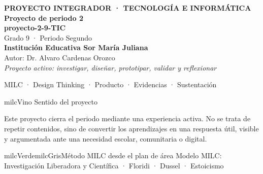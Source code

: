 \documentclass[11pt,letterpaper]{article}
\begin{document}
\thispagestyle{empty}

\vspace*{.85cm}
\begin{tcolorbox}[
  enhanced,colback=milcVino,colframe=milcVino,arc=12mm,width=.86\textwidth,
  boxrule=0pt,left=12mm,right=12mm,top=11mm,bottom=11mm,center,
  overlay={\draw[milcMagenta,line width=2pt,dash pattern=on 9pt off 8pt,rounded corners=10mm]
  ([xshift=7mm,yshift=-7mm]frame.north west) rectangle ([xshift=-7mm,yshift=7mm]frame.south east);}]
  \centering
  {\sffamily\bfseries\color{white}\fontsize{15}{17}\selectfont PROYECTO INTEGRADOR · TECNOLOGÍA E INFORMÁTICA}\\[1.0cm]
  {\sffamily\bfseries\color{white}\fontsize{30}{33}\selectfont Proyecto de periodo 2}\\[3mm]
  {\sffamily\bfseries\color{milcMostaza}\fontsize{25}{28}\selectfont proyecto-2-9-TIC}\\[8mm]
  {\sffamily\color{white}\Large Grado 9 · Periodo Segundo}\\[1.0cm]
  {\sffamily\bfseries\color{white}\large Institución Educativa Sor María Juliana}\\[2mm]
  {\sffamily\color{white}Autor: Dr. Alvaro Cardenas Orozco}\\[4mm]
  {\sffamily\itshape\color{white}Proyecto activo: investigar, diseñar, prototipar, validar y reflexionar}
\end{tcolorbox}
\vfill
\begin{tcolorbox}[enhanced,colback=milcVino!72!black,colframe=milcVino!72!black,arc=5mm,boxrule=0pt,width=.86\textwidth,left=6mm,right=6mm,top=4mm,bottom=4mm,center]
{\color{white}\sffamily\small MILC · Design Thinking · Producto · Evidencias · Sustentación}
\end{tcolorbox}

\newpage
\begin{titlebox}{milcVino}
Sentido del proyecto
\end{titlebox}
\begin{multicols}{2}
Este proyecto cierra el periodo mediante una experiencia activa. No se trata de repetir contenidos, sino de convertir los aprendizajes en una respuesta útil, visible y argumentada ante una necesidad escolar, comunitaria o digital.

\columnbreak
\begin{softbox}{milcVerde}{milcGris}{Método MILC desde el plan de área}
Modelo MILC: Investigación Liberadora y Científica · Floridi · Dussel · Estoicismo
\end{softbox}
\end{multicols}
\end{document}
